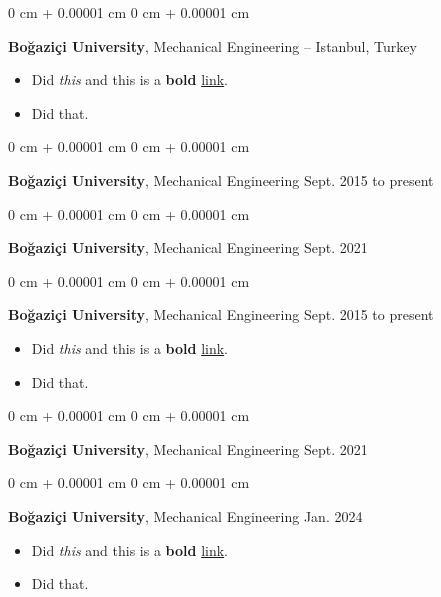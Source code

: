 \documentclass[10pt, letterpaper]{article}
\newenvironment{highlights}{
    \begin{itemize}[
        topsep=0.10 cm,
        parsep=0.10 cm,
        partopsep=0pt,
        itemsep=0pt,
        leftmargin=0 cm + 10pt
    ]
}{
    \end{itemize}
        
    \vspace{-0.20cm}
} %
\newenvironment{onecolentry}{
    \begin{adjustwidth}{
        0 cm + 0.00001 cm
    }{
        0 cm + 0.00001 cm
    }
}{
    \end{adjustwidth}
} %
\begin{document}
        \begin{onecolentry}
            \textbf{Boğaziçi University}, Mechanical Engineering -- Istanbul, Turkey \hfill 
            \begin{highlights}
                \item Did \textit{this} and this is a \textbf{bold} \href{https://example.com}{link}.
                \item Did that.
            \end{highlights}
        \end{onecolentry}

        \vspace{0.1 cm}

        \begin{onecolentry}
            \textbf{Boğaziçi University}, Mechanical Engineering \hfill Sept. 2015 to present
        \end{onecolentry}

        \vspace{0.1 cm}

        \begin{onecolentry}
            \textbf{Boğaziçi University}, Mechanical Engineering \hfill Sept. 2021
        \end{onecolentry}

        \vspace{0.1 cm}

        \begin{onecolentry}
            \textbf{Boğaziçi University}, Mechanical Engineering \hfill Sept. 2015 to present
            \begin{highlights}
                \item Did \textit{this} and this is a \textbf{bold} \href{https://example.com}{link}.
                \item Did that.
            \end{highlights}
        \end{onecolentry}

        \vspace{0.1 cm}

        \begin{onecolentry}
            \textbf{Boğaziçi University}, Mechanical Engineering \hfill Sept. 2021
        \end{onecolentry}

        \vspace{0.1 cm}

        \begin{onecolentry}
            \textbf{Boğaziçi University}, Mechanical Engineering \hfill Jan. 2024
            \begin{highlights}
                \item Did \textit{this} and this is a \textbf{bold} \href{https://example.com}{link}.
                \item Did that.
            \end{highlights}
        \end{onecolentry}
\end{document}
